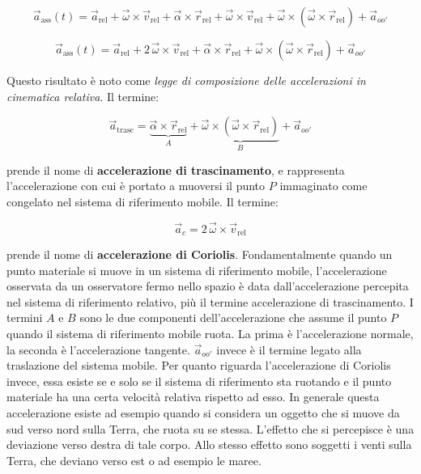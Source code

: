 \[
	\vec{a}_{\text{ass}}(t)=\vec{a}_{\text{rel}} +\vec{\omega} \times \vec{v}_{\text{rel}}+\vec{\alpha}\times \vec{r}_{\text{rel}}+\vec{\omega} \times \vec{v}_{\text{rel}}+ \vec{\omega}\times({\vec{\omega}}\times \vec{r}_{\text{rel}})+\vec{a}_{oo'}
\]

\begin{equation}
	\boxed{\vec{a}_{\text{ass}}(t)=\vec{a}_{\text{rel}} +2\,\vec{\omega} \times \vec{v}_{\text{rel}}+\vec{\alpha}\times \vec{r}_{\text{rel}}+ \vec{\omega}\times({\vec{\omega}}\times \vec{r}_{\text{rel}})+\vec{a}_{oo'}}
\end{equation}

Questo risultato è noto come \emph{legge di composizione delle accelerazioni in cinematica relativa}. Il termine:

\[
	\vec{a}_{\text{trasc}}=\underbrace{\vec{\alpha}\times \vec{r}_{\text{rel}}}_A+ \underbrace{\vec{\omega}\times({\vec{\omega}}\times \vec{r}_{\text{rel}})}_B+\vec{a}_{oo'}
\]

prende il nome di \textbf{accelerazione di trascinamento}, e rappresenta l'accelerazione con cui è portato a muoversi il punto $P$ immaginato come congelato nel sistema di riferimento mobile. Il termine:

\[
	\vec{a}_c= 2\,\vec{\omega} \times \vec{v}_{\text{rel}}
\]

prende il nome di \textbf{accelerazione di Coriolis}.
Fondamentalmente quando un punto materiale si muove in un sistema di riferimento mobile, l'accelerazione osservata da un osservatore fermo nello spazio è data dall'accelerazione percepita nel sistema di riferimento relativo, più il termine accelerazione di trascinamento.
I termini $A$ e $B$ sono le due componenti dell'accelerazione che assume il punto $P$ quando il sistema di riferimento mobile ruota. La prima è l'accelerazione normale, la seconda è l'accelerazione tangente. $\vec{a}_{oo'}$ invece è il termine legato alla traslazione del sistema mobile.
Per quanto riguarda l'accelerazione di Coriolis invece, essa esiste se e solo se il sistema di riferimento sta ruotando e il punto materiale ha una certa velocità relativa rispetto ad esso. In generale questa accelerazione esiste ad esempio quando si considera un oggetto che si muove da sud verso nord sulla Terra, che ruota su se stessa. L'effetto che si percepisce è una deviazione verso destra di tale corpo. Allo stesso effetto sono soggetti i venti sulla Terra, che deviano verso est o ad esempio le maree.
